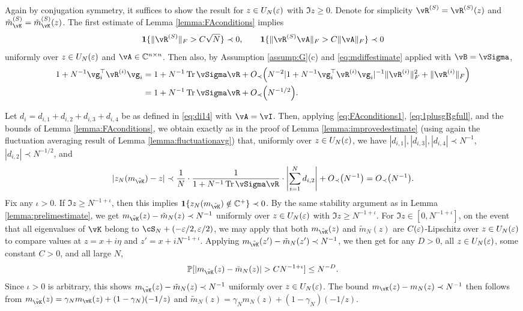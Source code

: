\begin{proof-of-theorem}[\ref{thm:deterministic_equ}]
Again by conjugation symmetry, it suffices to show the result for
$z \in U_N(\varepsilon)$ with $\Im z \geq 0$. Denote for simplicity
$\vR^{(S)}=\vR^{(S)}(z)$ and $\tilde m_{\vK}^{(S)}=\tilde m_{\vK}^{(S)}(z)$.
The first estimate of Lemma \ref{lemma:FAconditions} implies
\begin{equation}\label{eq:FAconditions1}
\bI\{\|\vR^{(S)}\|_F>C\sqrt{N}\} \prec 0,
\qquad \bI\{\|\vR^{(S)}\vA\|_F>C\|\vA\|_F\} \prec 0
\end{equation}
uniformly over $z \in U_N(\varepsilon)$ and $\vA \in \C^{n \times n}$. Then also, by
Assumption \ref{assump:G}(c) and \eqref{eq:mdiffestimate} applied with
$\vB=\vSigma$,
\begin{align}
1+N^{-1}\vg_i^\top \vR^{(i)}\vg_i
&=1+N^{-1}\Tr \vSigma \vR+\SD{N^{-2}|1+N^{-1}\vg_i^\top
\vR^{(i)}\vg_i|^{-1}\|\vR^{(i)}\|_F^2+\|\vR^{(i)}\|_F}\nonumber\\
&=1+N^{-1}\Tr \vSigma \vR+\SD{N^{-1/2}}.\label{eq:1plusgRgfull}
\end{align}

Let $d_i=d_{i,1}+d_{i,2}+d_{i,3}+d_{i,4}$ be as defined in \eqref{eq:di14} with
$\vA=\vI$. Then, applying \eqref{eq:FAconditions1}, \eqref{eq:1plusgRgfull},
and the bounds of Lemma \ref{lemma:FAconditions}, we obtain exactly as in the
proof of Lemma \ref{lemma:improvedestimate} (using again the fluctuation
averaging result of Lemma \ref{lemma:fluctuationavg}) that,
uniformly over $z \in
U_N(\varepsilon)$, we have $|d_{i,1}|,|d_{i,3}|,|d_{i,4}| \prec N^{-1}$,
$|d_{i,2}| \prec N^{-1/2}$, and
\[|z_N(m_{\tilde \vK})-z| \prec
\frac{1}{N} \cdot \frac{1}{1+N^{-1}\Tr \vSigma\vR}
\cdot \left|\sum_{i=1}^N d_{i,2}\right|+\SD{N^{-1}}=\SD{N^{-1}}.\]
Fix any $\iota>0$. If $\Im z \geq N^{-1+\iota}$, then this
implies $\bI\{z_N(m_{\tilde \vK}) \notin \C^+\} \prec 0$. By the same
stability argument as in Lemma \ref{lemma:prelimestimate}, we get
$m_{\tilde \vK}(z)-\tilde m_N(z) \prec N^{-1}$
uniformly over $z \in U_N(\varepsilon)$ with $\Im z \geq N^{-1+\iota}$. For
$\Im z \in [0,N^{-1+\iota}]$, on the event that all eigenvalues of $\vK$ belong
to $\cS_N+(-\eps/2,\eps/2)$, we may apply that both $m_{\tilde \vK}(z)$
and $\tilde m_N(z)$ are $C(\varepsilon)$-Lipschitz over $z \in U_N(\varepsilon)$ to
compare values at $z=x+i\eta$ and $z'=x+iN^{-1+\iota}$.
Applying $m_{\tilde \vK}(z')-\tilde m_N(z') \prec N^{-1}$, we then get for any
$D>0$, all $z \in U_N(\varepsilon)$, some constant $C>0$, and all large $N$,
\[\P[|m_{\tilde \vK}(z)-\tilde m_N(z)|>CN^{-1+\iota}] \leq N^{-D}.\]
Since $\iota>0$ is arbitrary, this shows
$m_{\tilde \vK}(z)-\tilde m_N(z) \prec N^{-1}$ uniformly over $z \in U_N(\varepsilon)$.
The bound $m_{\vK}(z)-m_N(z) \prec N^{-1}$ then follows from
$m_{\tilde \vK}(z)=\gamma_N m_{\vK}(z)+(1-\gamma_N)(-1/z)$ and
$\tilde m_N(z)=\gamma_N m_N(z)+(1-\gamma_N)(-1/z)$.


\end{proof-of-theorem}
